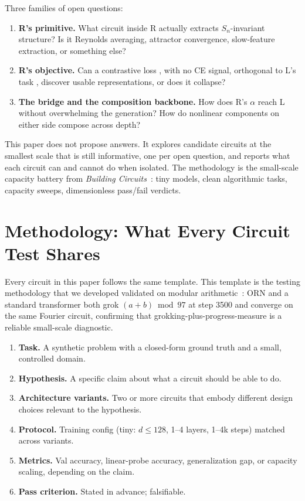 \documentclass[10pt, twocolumn, a4paper]{article}
\newcommand{\Sn}{S_n}
\begin{document}
Three families of open questions:

\begin{enumerate}[nosep]
\item \textbf{R's primitive.} What circuit inside R actually extracts $\Sn$-invariant structure? Is it Reynolds averaging, attractor convergence, slow-feature extraction, or something else?
\item \textbf{R's objective.} Can a contrastive loss ,  with no CE signal, orthogonal to L's task ,  discover usable representations, or does it collapse?
\item \textbf{The bridge and the composition backbone.} How does R's $\alpha$ reach L without overwhelming the generation? How do nonlinear components on either side compose across depth?
\end{enumerate}

This paper does not propose answers. It explores candidate circuits at the smallest scale that is still informative, one per open question, and reports what each circuit can and cannot do when isolated. The methodology is the small-scale capacity battery from \emph{Building Circuits}~\cite{building-circuits}: tiny models, clean algorithmic tasks, capacity sweeps, dimensionless pass/fail verdicts.

\section{Methodology: What Every Circuit Test Shares}

Every circuit in this paper follows the same template. This template is the testing methodology that we developed validated on modular arithmetic~\cite{building-circuits}: ORN and a standard transformer both grok $(a+b) \bmod 97$ at step 3500 and converge on the same Fourier circuit, confirming that grokking-plus-progress-measure is a reliable small-scale diagnostic.

\begin{enumerate}[nosep]
\item \textbf{Task.} A synthetic problem with a closed-form ground truth and a small, controlled domain.
\item \textbf{Hypothesis.} A specific claim about what a circuit should be able to do.
\item \textbf{Architecture variants.} Two or more circuits that embody different design choices relevant to the hypothesis.
\item \textbf{Protocol.} Training config (tiny: $d \le 128$, 1--4 layers, 1--4k steps) matched across variants.
\item \textbf{Metrics.} Val accuracy, linear-probe accuracy, generalization gap, or capacity scaling, depending on the claim.
\item \textbf{Pass criterion.} Stated in advance; falsifiable.
\end{enumerate}
\end{document}
